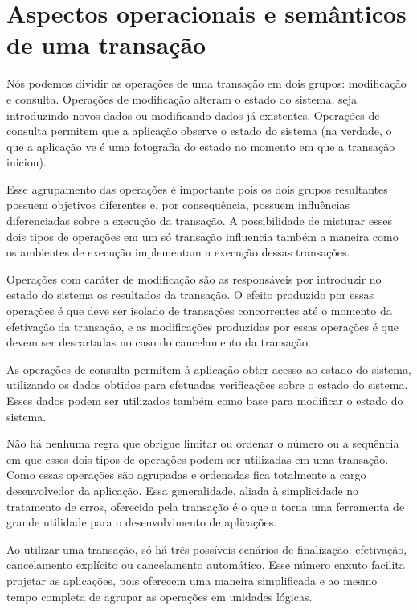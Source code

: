 \documentclass[11pt,twoside,a4paper]{book}
\begin{document}
\section{Aspectos operacionais e semânticos de uma transação}
\label{sec:aspectos_operacionais_e_semanticos}

Nós podemos dividir as operações de uma transação em dois grupos: modificação e consulta. Operações de modificação alteram o estado do sistema, seja introduzindo novos dados ou modificando dados já existentes. Operações de consulta permitem que a aplicação observe o estado do sistema (na verdade, o que a aplicação ve é uma fotografia do estado no momento em que a transação iniciou).

Esse agrupamento das operações é importante pois os dois grupos resultantes possuem objetivos diferentes e, por consequência, possuem influências diferenciadas sobre a execução da transação. A possibilidade de misturar esses dois tipos de operações em um só transação influencia também a maneira como os ambientes de execução implementam a execução dessas transações.

Operações com caráter de modificação são as responsáveis por introduzir no estado do sistema os resultados da transação. O efeito produzido por essas operações é que deve ser isolado de transações concorrentes até o momento da efetivação da transação, e as modificações produzidas por essas operações é que devem ser descartadas no caso do cancelamento da transação. 

As operações de consulta permitem à aplicação obter acesso ao estado do sistema, utilizando os dados obtidos para efetuadas verificações sobre o estado do sistema. Esses dados podem ser utilizados também como base para modificar o estado do sistema.

Não há nenhuma regra que obrigue limitar ou ordenar o número ou a sequência em que esses dois tipos de operações podem ser utilizadas em uma transação. Como essas operações são agrupadas e ordenadas fica totalmente a cargo desenvolvedor da aplicação. Essa generalidade, aliada à simplicidade no tratamento de erros, oferecida pela transação é o que a torna uma ferramenta de grande utilidade para o desenvolvimento de aplicações.

Ao utilizar uma transação, só há três possíveis cenários de finalização: efetivação, cancelamento explícito ou cancelamento automático. Esse número enxuto facilita projetar as aplicações, pois oferecem uma maneira simplificada e ao mesmo tempo completa de agrupar as operações em unidades lógicas.
\end{document}

